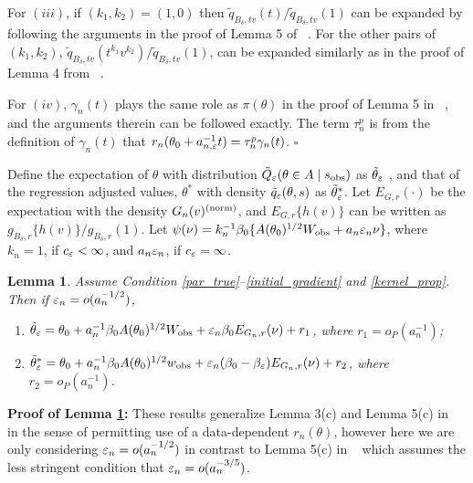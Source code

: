 \documentclass{article}
\newtheorem{lemma}{Lemma}
\begin{document}
	For $(iii)$, if $(k_1,k_2)=(1,0)$ then $\tilde{q}_{B_{\delta},tv}(t)/\tilde{q}_{B_{\delta},tv}(1)$
	can be expanded by following the arguments in the proof of Lemma 5
	of ~\cite{Li2016}. For the other pairs of $(k_1,k_2)$, $\tilde{q}_{B_{\delta},tv}(t^{k_{1}}v^{k_{2}})/\tilde{q}_{B_{\delta},tv}(1)$,
	can be expanded similarly as in the proof of Lemma 4 from ~\cite{Li2017}.
	
	For $(iv)$, $\gamma_{n}(t)$ plays the same role as $\pi(\theta)$
	in the proof of Lemma 5 in ~\cite{Li2016}, and the arguments therein
	can be followed exactly. The term $\tau_{n}^{p}$ is from the definition
	of $\gamma_{n}(t)$ that $r_{n}(\theta_0+a_{n,\varepsilon}^{-1}t)=\tau_{n}^{p}\gamma_{n}(t)$.
	\hfill{$\square$} 
	
	
\pagebreak 
Define the expectation of $\theta$ with distribution $\tilde{Q}_{\varepsilon}(\theta\in A\mid s_{\rm obs})$
as $\tilde{\theta}_{\varepsilon}$ , and that of the regression adjusted values, $\theta^*$ 
with density $\tilde{q}_{\varepsilon}(\theta,s)$ as $\tilde{\theta}_{\varepsilon}^{*}$.
Let $E_{G,r}(\cdot)$ be the expectation with the density $G_{n}(v)^{({\rm norm})}$,
and $E_{G,r}\{h(v)\}$ can be written as $g_{B_{\delta},r}\{h(v)\}/g_{B_{\delta},r}(1)$.
Let $\psi(\nu)=k_{n}^{-1}\beta_{0}\{A(\theta_{0})^{1/2}W_{\rm obs}+a_{n}\varepsilon_{n}\nu\}$,
where $k_{n}=1$, if $c_{\varepsilon}<\infty$, and $a_{n}\varepsilon_{n}$,
if $c_{\varepsilon}=\infty$. 

\begin{lemma}\label{Alemma3} Assume Condition \ref{par_true}--\ref{initial_gradient} and \ref{kernel_prop}. Then if $\varepsilon_{n}=o(a_{n}^{-1/2})$, 
	\begin{enumerate}
		\item[(i)] $\tilde{\theta}_{\varepsilon}=\theta_{0}+a_{n}^{-1}\beta_{0}A(\theta_{0})^{1/2}W_{\rm obs}+\varepsilon_{n}\beta_{0}E_{G_{n},r}(\nu)+r_{1}$,
		where $r_{1}=o_{P}(a_{n}^{-1})$; 
		\item[(ii)] $\tilde{\theta}_{\varepsilon}^{*}=\theta_{0}+a_{n}^{-1}\beta_{0}A(\theta_{0})^{1/2}w_{\rm obs}+\varepsilon_{n}(\beta_{0}-\beta_{\varepsilon})E_{G_{n},r}(\nu)+r_{2}$,
		where $r_{2}=o_{P}(a_{n}^{-1})$. 
	\end{enumerate}\end{lemma}
{\bf Proof of Lemma \ref{Alemma3}:} 
	These results generalize Lemma 3(c) and Lemma 5(c) in ~\cite{Li2017} in the sense of permitting use of a data-dependent $r_n(\theta)$, however here we are only considering $\varepsilon_n = o(a_n^{-1/2})$ in contrast to Lemma 5(c) in ~\cite{Li2017} which assumes the less stringent condition that $\varepsilon_n = o(a_n^{-3/5})$.
	
\end{document}
